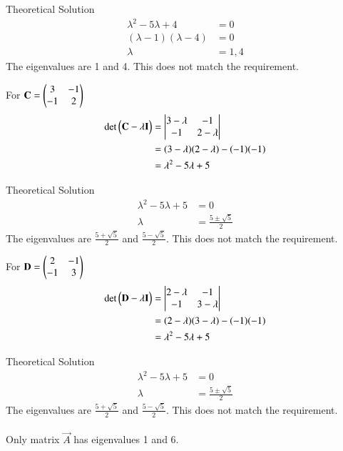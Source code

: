 \documentclass{beamer}
\begin{document}
\begin{frame}{Theoretical Solution}
\begin{align}
\lambda^2 - 5\lambda + 4 &= 0 \\
(\lambda - 1)(\lambda - 4) &= 0 \\
\lambda &= 1, 4
\end{align}
The eigenvalues are 1 and 4. This does not match the requirement.

For $\mathbf{C}=\begin{pmatrix}3 & -1 \\ -1 & 2\end{pmatrix}$
\begin{align}
\det\begin{pmatrix}\mathbf{C} - \lambda \mathbf{I}\end{pmatrix} &= \begin{vmatrix}
3-\lambda & -1\\
-1 & 2-\lambda
\end{vmatrix} \\
&= (3-\lambda)(2-\lambda)-(-1)(-1) \\
&= \lambda^2 - 5\lambda + 5
\end{align}
\end{frame}

\begin{frame}{Theoretical Solution}
\begin{align}
\lambda^2 - 5\lambda + 5 &= 0 \\
\lambda &=\frac{5 \pm \sqrt{5}}{2}
\end{align}
The eigenvalues are $\frac{5 + \sqrt{5}}{2}$ and $\frac{5 - \sqrt{5}}{2}$. This does not match the requirement.

For $\mathbf{D}=\begin{pmatrix}2 & -1 \\ -1 & 3\end{pmatrix}$
\begin{align}
\det\begin{pmatrix}\mathbf{D} - \lambda \mathbf{I}\end{pmatrix} &= \begin{vmatrix}
2-\lambda & -1\\
-1 & 3-\lambda
\end{vmatrix} \\
&= (2-\lambda)(3-\lambda)-(-1)(-1) \\
&= \lambda^2 - 5\lambda + 5
\end{align}
\end{frame}

\begin{frame}{Theoretical Solution}
\begin{align}
\lambda^2 - 5\lambda + 5 &= 0 \\
\lambda&= \frac{5 \pm \sqrt{5}}{2}
\end{align}
The eigenvalues are $\frac{5 + \sqrt{5}}{2}$ and $\frac{5 - \sqrt{5}}{2}$. This does not match the requirement.
\\\\
Only matrix $\vec{A}$ has eigenvalues 1 and 6.
\end{frame}
\end{document}
